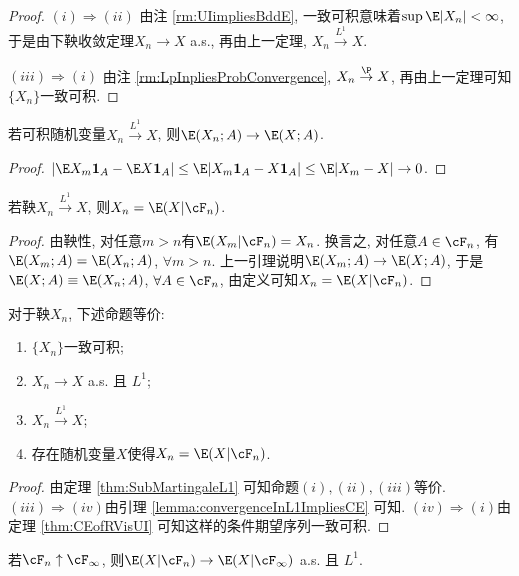 \documentclass[a4paper, 10pt]{ctexart}
\begin{document}
\begin{proof}
	$(i) \Rightarrow (ii)$ 由注 \ref{rm:UIimpliesBddE}, 一致可积意味着$\sup \E |X_n| < \infty$, 于是由下鞅收敛定理$X_n \to X$ a.s., 再由上一定理, $X_n \stackrel{L^1}{\to} X$. 
	
	$(iii) \Rightarrow (i)$ 由注 \ref{rm:LpInpliesProbConvergence}, $X_n \stackrel{\P}{\to} X$, 再由上一定理可知$\{X_n\}$一致可积. 
\end{proof}

\begin{lemma}
	若可积随机变量$X_n \stackrel{L^1}{\to} X$, 则$\E(X_n;A) \to \E(X;A)$. 
\end{lemma}
\begin{proof}
	$|\E X_m \mathbf{1}_A - \E X \mathbf{1}_A| \leq \E |X_m \mathbf{1}_A - X \mathbf{1}_A| \leq \E|X_m - X| \to 0$. 
\end{proof}

\begin{lemma}\label{lemma:convergenceInL1ImpliesCE}
	若鞅$X_n \stackrel{L^1}{\to} X$, 则$X_n = \E(X | \cF_n)$. 
\end{lemma}
\begin{proof}
	由鞅性, 对任意$m > n$有$\E(X_m|\cF_n) = X_n$. 
	换言之, 对任意$A \in \cF_n$, 有$\E(X_m;A) = \E(X_n;A)$, $\forall m > n$. 
	上一引理说明$\E(X_m;A) \to \E(X;A)$, 于是$\E(X;A) \equiv \E(X_n;A)$, $\forall A \in \cF_n$, 由定义可知$X_n = \E(X | \cF_n)$. 
\end{proof}

\begin{theorem}\label{thm:uiMartingale}
	对于鞅$X_n$, 下述命题等价: 
	\begin{enumerate}[label=(\roman*)]
		\item $\{X_n\}$一致可积; 
		\item $X_n \to X$ a.s. 且 $L^1$;
		\item $X_n \stackrel{L^1}{\to} X$; 
		\item 存在随机变量$X$使得$X_n = \E(X|\cF_n)$. 
	\end{enumerate}
\end{theorem}
\begin{proof}
	由定理 \ref{thm:SubMartingaleL1} 可知命题$(i), (ii), (iii)$等价. 
	$(iii) \Rightarrow (iv)$由引理 \ref{lemma:convergenceInL1ImpliesCE} 可知. 
	$(iv) \Rightarrow (i)$由定理 \ref{thm:CEofRVisUI} 可知这样的条件期望序列一致可积. 
\end{proof}

\begin{theorem}
	若$\cF_n \uparrow \cF_{\infty}$, 则$\E(X|\cF_n) \to \E(X|\cF_{\infty})$ a.s. 且 $L^1$. 
\end{theorem}
\end{document}
